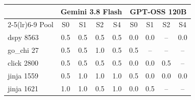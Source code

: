 \begin{tabular}{@{}lcccccccc@{}}
\toprule
 & \multicolumn{4}{c}{Gemini 3.8 Flash} & \multicolumn{4}{c}{GPT-OSS 120B} \\
\cmidrule(lr){2-5}\cmidrule(lr){6-9}
Pool & S0 & S1 & S2 & S4 & S0 & S1 & S2 & S4 \\
\midrule
dspy 8563 & 0.5 & 0.5 & 0.5 & 0.5 & 0.0 & 0.0 & -- & 0.0 \\
go\_chi 27 & 0.5 & 0.5 & 1.0 & 0.5 & 0.5 & -- & -- & -- \\
click 2800 & 0.5 & 0.5 & 0.5 & 0.5 & 0.0 & 0.0 & 0.5 & -- \\
jinja 1559 & 0.5 & 1.0 & 1.0 & 1.0 & 0.5 & 0.0 & 0.0 & 0.0 \\
jinja 1621 & 1.0 & 1.0 & 0.5 & 1.0 & 0.0 & 0.5 & -- & -- \\
\bottomrule
\end{tabular}
